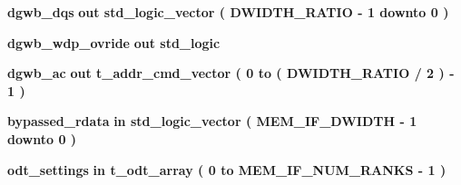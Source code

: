 \begin{DoxyCompactItemize}
\item 
{\bf dgwb\+\_\+dqs}  {\bfseries {\bfseries \textcolor{keywordflow}{out}\textcolor{vhdlchar}{ }}} {\bfseries \textcolor{comment}{std\+\_\+logic\+\_\+vector}\textcolor{vhdlchar}{ }\textcolor{vhdlchar}{(}\textcolor{vhdlchar}{ }\textcolor{vhdlchar}{ }\textcolor{vhdlchar}{ }\textcolor{vhdlchar}{ }{\bfseries {\bf D\+W\+I\+D\+T\+H\+\_\+\+R\+A\+T\+IO}} \textcolor{vhdlchar}{-\/}\textcolor{vhdlchar}{ } \textcolor{vhdldigit}{1} \textcolor{vhdlchar}{ }\textcolor{keywordflow}{downto}\textcolor{vhdlchar}{ }\textcolor{vhdlchar}{ } \textcolor{vhdldigit}{0} \textcolor{vhdlchar}{ }\textcolor{vhdlchar}{)}\textcolor{vhdlchar}{ }} 
\item 
{\bf dgwb\+\_\+wdp\+\_\+ovride}  {\bfseries {\bfseries \textcolor{keywordflow}{out}\textcolor{vhdlchar}{ }}} {\bfseries \textcolor{comment}{std\+\_\+logic}\textcolor{vhdlchar}{ }} 
\item 
{\bf dgwb\+\_\+ac}  {\bfseries {\bfseries \textcolor{keywordflow}{out}\textcolor{vhdlchar}{ }}} {\bfseries {\bfseries {\bf t\+\_\+addr\+\_\+cmd\+\_\+vector}} \textcolor{vhdlchar}{ }\textcolor{vhdlchar}{(}\textcolor{vhdlchar}{ }\textcolor{vhdlchar}{ } \textcolor{vhdldigit}{0} \textcolor{vhdlchar}{ }\textcolor{keywordflow}{to}\textcolor{vhdlchar}{ }\textcolor{vhdlchar}{(}\textcolor{vhdlchar}{ }\textcolor{vhdlchar}{ }\textcolor{vhdlchar}{ }\textcolor{vhdlchar}{ }{\bfseries {\bf D\+W\+I\+D\+T\+H\+\_\+\+R\+A\+T\+IO}} \textcolor{vhdlchar}{/}\textcolor{vhdlchar}{ } \textcolor{vhdldigit}{2} \textcolor{vhdlchar}{ }\textcolor{vhdlchar}{)}\textcolor{vhdlchar}{ }\textcolor{vhdlchar}{-\/}\textcolor{vhdlchar}{ } \textcolor{vhdldigit}{1} \textcolor{vhdlchar}{ }\textcolor{vhdlchar}{)}\textcolor{vhdlchar}{ }} 
\item 
{\bf bypassed\+\_\+rdata}  {\bfseries {\bfseries \textcolor{keywordflow}{in}\textcolor{vhdlchar}{ }}} {\bfseries \textcolor{comment}{std\+\_\+logic\+\_\+vector}\textcolor{vhdlchar}{ }\textcolor{vhdlchar}{(}\textcolor{vhdlchar}{ }\textcolor{vhdlchar}{ }\textcolor{vhdlchar}{ }\textcolor{vhdlchar}{ }{\bfseries {\bf M\+E\+M\+\_\+\+I\+F\+\_\+\+D\+W\+I\+D\+TH}} \textcolor{vhdlchar}{-\/}\textcolor{vhdlchar}{ } \textcolor{vhdldigit}{1} \textcolor{vhdlchar}{ }\textcolor{keywordflow}{downto}\textcolor{vhdlchar}{ }\textcolor{vhdlchar}{ } \textcolor{vhdldigit}{0} \textcolor{vhdlchar}{ }\textcolor{vhdlchar}{)}\textcolor{vhdlchar}{ }} 
\item 
{\bf odt\+\_\+settings}  {\bfseries {\bfseries \textcolor{keywordflow}{in}\textcolor{vhdlchar}{ }}} {\bfseries {\bfseries {\bf t\+\_\+odt\+\_\+array}} \textcolor{vhdlchar}{ }\textcolor{vhdlchar}{(}\textcolor{vhdlchar}{ }\textcolor{vhdlchar}{ } \textcolor{vhdldigit}{0} \textcolor{vhdlchar}{ }\textcolor{keywordflow}{to}\textcolor{vhdlchar}{ }\textcolor{vhdlchar}{ }\textcolor{vhdlchar}{ }\textcolor{vhdlchar}{ }{\bfseries {\bf M\+E\+M\+\_\+\+I\+F\+\_\+\+N\+U\+M\+\_\+\+R\+A\+N\+KS}} \textcolor{vhdlchar}{-\/}\textcolor{vhdlchar}{ } \textcolor{vhdldigit}{1} \textcolor{vhdlchar}{ }\textcolor{vhdlchar}{)}\textcolor{vhdlchar}{ }} 
\end{DoxyCompactItemize}


